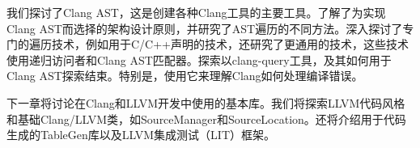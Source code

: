 我们探讨了Clang AST，这是创建各种Clang工具的主要工具。了解了为实现Clang AST而选择的架构设计原则，并研究了AST遍历的不同方法。深入探讨了专门的遍历技术，例如用于C/C++声明的技术，还研究了更通用的技术，这些技术使用递归访问者和Clang AST匹配器。探索以clang-query工具，及其如何用于Clang AST探索结束。特别是，使用它来理解Clang如何处理编译错误。

下一章将讨论在Clang和LLVM开发中使用的基本库。我们将探索LLVM代码风格和基础Clang/LLVM类，如SourceManager和SourceLocation。还将介绍用于代码生成的TableGen库以及LLVM集成测试（LIT）框架。